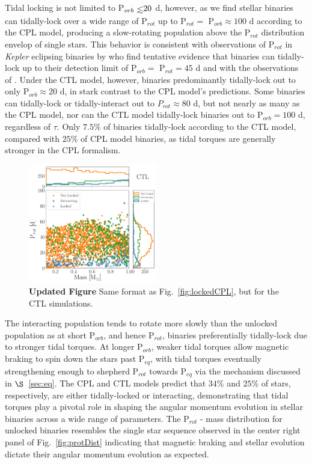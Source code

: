 \documentclass[twocolumn]{aastex61}
\def\lsim{~\rlap{$<$}{\lower 1.0ex\hbox{$\sim$}}}
\newcommand{\xxx}[1]{{\textbf{#1}}}
\newcommand{\kepler}[0]{\textit{Kepler}\xspace}
\begin{document}
Tidal locking is not limited to P$_{orb} \lsim 20$ d, however, as we find stellar binaries can tidally-lock over a wide range of P$_{rot}$ up to P$_{rot} =$ P$_{orb} \approx 100$ d according to the CPL model, producing a slow-rotating population above the P$_{rot}$ distribution envelop of single stars. This behavior is consistent with observations of P$_{rot}$ in \kepler eclipsing binaries by \citet{Lurie2017} who find tentative evidence that binaries can tidally-lock up to their detection limit of P$_{orb} = $ P$_{rot} = 45$ d and with the observations of \citet{Abt2004}.  Under the CTL model, however, binaries predominantly tidally-lock out to only P$_{orb} \approx 20$ d, in stark contrast to the CPL model's predictions. Some binaries can tidally-lock or tidally-interact out to $P_{rot} \approx 80$ d, but not nearly as many as the CPL model, nor can the CTL model tidally-lock binaries out to P$_{orb} = 100$ d, regardless of $\tau$. Only $7.5\%$ of binaries tidally-lock according to the CTL model, compared with $25\%$ of CPL model binaries, as tidal torques are generally stronger in the CPL formalism.   

\begin{figure}
	\includegraphics[width=0.5\textwidth]{../Plots/lockedCTL.pdf}
   \caption{\xxx{Updated Figure} Same format as Fig.~\ref{fig:lockedCPL}, but for the CTL simulations. }%
    \label{fig:lockedCTL}%
\end{figure}

The interacting population tends to rotate more slowly than the unlocked population as at short P$_{orb}$, and hence P$_{rot}$, binaries preferentially tidally-lock due to stronger tidal torques.  At longer P$_{orb}$, weaker tidal torques allow magnetic braking to spin down the stars past P$_{eq}$, with tidal torques eventually strengthening enough to shepherd P$_{rot}$ towards P$_{eq}$ via the mechanism discussed in $\S$~\ref{sec:eq}. The CPL and CTL models predict that $34\%$ and $25\%$ of stars, respectively, are either tidally-locked or interacting, demonstrating that tidal torques play a pivotal role in shaping the angular momentum evolution in stellar binaries across a wide range of parameters. The P$_{rot}$ - mass distribution for unlocked binaries resembles the single star sequence observed in the center right panel of Fig.~\ref{fig:protDist} indicating that magnetic braking and stellar evolution dictate their angular momentum evolution as expected.
\end{document}
